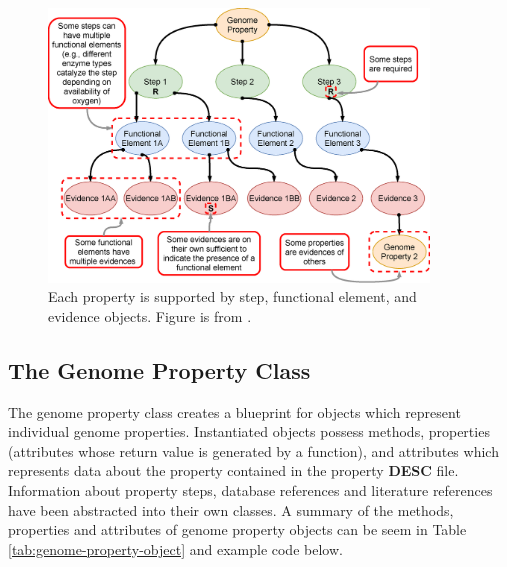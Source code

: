\begin{figure}[!ht]
     \centering
	\includegraphics[width=0.90\textwidth]{media/Figure_1B.eps}
	 \caption{Each property is supported by step, functional element, and evidence objects. Figure is from  \cite{bergstrand2019pygenprop}.}
	  \label{fig:property}
\end{figure}

\subsection{The Genome Property Class}

The genome property class creates a blueprint for objects which represent individual genome properties. Instantiated objects possess methods, properties (attributes whose return value is generated by a function), and attributes which represents data about the property contained in the property \textbf{DESC} file. Information about property steps, database references and literature references have been abstracted into their own classes. A summary of the methods, properties and attributes of genome property objects can be seem in Table \ref{tab:genome-property-object} and example code below.

